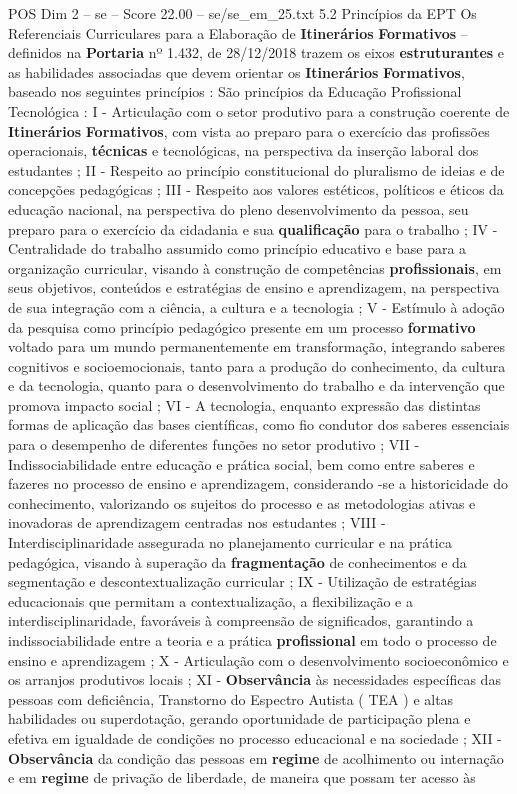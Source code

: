 \begin{textsample}{POS Dim 2 – se – Score 22.00 – se/se\_em\_25.txt}  \label{ex:f2_pos_030}
5.2 Princípios da EPT Os Referenciais Curriculares para a Elaboração de \textbf{Itinerários} \textbf{Formativos} – definidos na \textbf{Portaria} nº 1.432, de 28/12/2018 trazem os eixos \textbf{estruturantes} e as habilidades associadas que devem orientar os \textbf{Itinerários} \textbf{Formativos}, baseado nos seguintes princípios : São princípios da Educação Profissional Tecnológica : I - Articulação com o setor produtivo para a construção coerente de \textbf{Itinerários} \textbf{Formativos}, com vista ao preparo para o exercício das profissões operacionais, \textbf{técnicas} e tecnológicas, na perspectiva da inserção laboral dos estudantes ; II - Respeito ao princípio constitucional do pluralismo de ideias e de concepções pedagógicas ; III - Respeito aos valores estéticos, políticos e éticos da educação nacional, na perspectiva do pleno desenvolvimento da pessoa, seu preparo para o exercício da cidadania e sua \textbf{qualificação} para o trabalho ; IV - Centralidade do trabalho assumido como princípio educativo e base para a organização curricular, visando à construção de competências \textbf{profissionais}, em seus objetivos, conteúdos e estratégias de ensino e aprendizagem, na perspectiva de sua integração com a ciência, a cultura e a tecnologia ; V - Estímulo à adoção da pesquisa como princípio pedagógico presente em um processo \textbf{formativo} voltado para um mundo permanentemente em transformação, integrando saberes cognitivos e socioemocionais, tanto para a produção do conhecimento, da cultura e da tecnologia, quanto para o desenvolvimento do trabalho e da intervenção que promova impacto social ; VI - A tecnologia, enquanto expressão das distintas formas de aplicação das bases científicas, como fio condutor dos saberes essenciais para o desempenho de diferentes funções no setor produtivo ; VII - Indissociabilidade entre educação e prática social, bem como entre saberes e fazeres no processo de ensino e aprendizagem, considerando -se a historicidade do conhecimento, valorizando os sujeitos do processo e as metodologias ativas e inovadoras de aprendizagem centradas nos estudantes ; VIII - Interdisciplinaridade assegurada no planejamento curricular e na prática pedagógica, visando à superação da \textbf{fragmentação} de conhecimentos e da segmentação e descontextualização curricular ; IX - Utilização de estratégias educacionais que permitam a contextualização, a flexibilização e a interdisciplinaridade, favoráveis à compreensão de significados, garantindo a indissociabilidade entre a teoria e a prática \textbf{profissional} em todo o processo de ensino e aprendizagem ; X - Articulação com o desenvolvimento socioeconômico e os arranjos produtivos locais ; XI - \textbf{Observância} às necessidades específicas das pessoas com deficiência, Transtorno do Espectro Autista ( TEA ) e altas habilidades ou superdotação, gerando oportunidade de participação plena e efetiva em igualdade de condições no processo educacional e na sociedade ; XII - \textbf{Observância} da condição das pessoas em \textbf{regime} de acolhimento ou internação e em \textbf{regime} de privação de liberdade, de maneira que possam ter acesso às 
\end{textsample}
